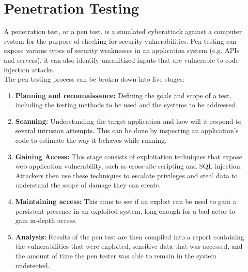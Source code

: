 \section{Penetration Testing}
A penetration test, or a pen test, is a simulated cyberattack against a computer system for the purpose of checking for security vulnerabilities. Pen testing can expose various types of security weaknesses in an application system (e.g. APIs and servers), it can also identify unsanitized inputs that are vulnerable to code injection attacks.\\
The pen testing process can be broken down into five stages:\\
\begin{enumerate}
    \item \textbf{Planning and reconnaissance:} Defining the goals and scope of a test, including the testing methods to be used and the systems to be addressed.
    \item \textbf{Scanning:} Understanding the target application and how will it respond to several intrusion attempts. This can be done by inspecting an application’s code to estimate the way it behaves while running.
    \item \textbf{Gaining Access:} This stage consists of exploitation techniques that expose web application vulnerability, such as cross-site scripting and SQL injection. Attackers then use these techniques to escalate privileges and steal data to understand the scope of damage they can create.
    \item \textbf{Maintaining access:} This aims to see if an exploit can be used to gain a persistent presence in an exploited system, long enough for a bad actor to gain in-depth access.
    \item \textbf{Analysis:} Results of the pen test are then compiled into a report containing the vulnerabilities that were exploited, sensitive data that was accessed, and the amount of time the pen tester was able to remain in the system undetected\cite{pentest}.
\end{enumerate}

